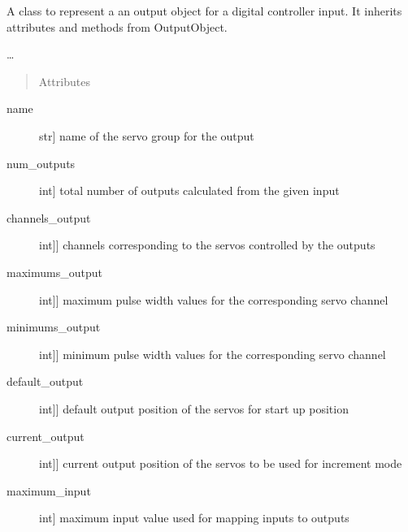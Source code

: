 \documentclass[letterpaper,10pt,english]{sphinxmanual}
\begin{document}
\begin{fulllineitems}
\label{\detokenize{generic:DigitalOutputObject.DigitalOutputObject}}
\sphinxAtStartPar
A class to represent a an output object for a digital controller input.
It inherits attributes and methods from OutputObject.

\sphinxAtStartPar
…
\begin{quote}\begin{description}
\item[{Attributes}] \leavevmode
\end{description}\end{quote}
\begin{description}
\item[{name}] \leavevmode{[}str{]}
\sphinxAtStartPar
name of the servo group for the output

\item[{num\_outputs}] \leavevmode{[}int{]}
\sphinxAtStartPar
total number of outputs calculated from the given input

\item[{channels\_output}] \leavevmode{[}{[}int{]}{]}
\sphinxAtStartPar
channels corresponding to the servos controlled by the outputs

\item[{maximums\_output}] \leavevmode{[}{[}int{]}{]}
\sphinxAtStartPar
maximum pulse width values for the corresponding servo channel

\item[{minimums\_output}] \leavevmode{[}{[}int{]}{]}
\sphinxAtStartPar
minimum pulse width values for the corresponding servo channel

\item[{default\_output}] \leavevmode{[}{[}int{]}{]}
\sphinxAtStartPar
default output position of the servos for start up position

\item[{current\_output}] \leavevmode{[}{[}int{]}{]}
\sphinxAtStartPar
current output position of the servos to be used for increment mode

\item[{maximum\_input}] \leavevmode{[}int{]}
\sphinxAtStartPar
maximum input value used for mapping inputs to outputs


\end{description}
\end{fulllineitems}
\end{document}
